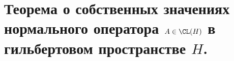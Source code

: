 \newpage
\section{Теорема о собственных значениях нормального оператора $A \in \CL(H)$ в гильбертовом пространстве $H$.}